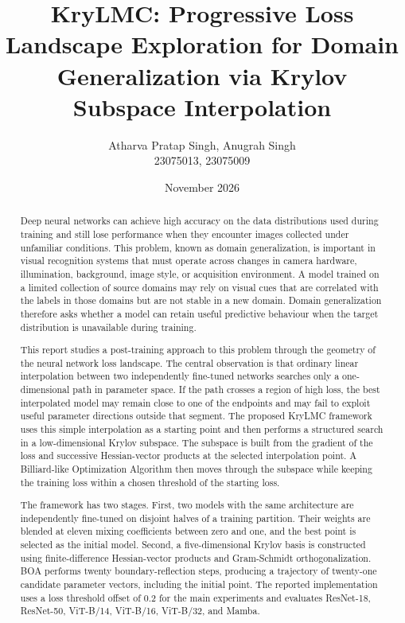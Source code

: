 \documentclass[11pt,a4paper]{article}
\title{\textbf{KryLMC: Progressive Loss Landscape Exploration for Domain Generalization via Krylov Subspace Interpolation}}
\author{Atharva Pratap Singh, Anugrah Singh\\23075013, 23075009}
\date{November 2026}
\begin{document}
\maketitle
\begingroup
\small
\tableofcontents
\endgroup
\newpage

\renewcommand{\abstractname}{1 Abstract}
\begin{abstract}
Deep neural networks can achieve high accuracy on the data distributions used during training and still lose performance when they encounter images collected under unfamiliar conditions. This problem, known as domain generalization, is important in visual recognition systems that must operate across changes in camera hardware, illumination, background, image style, or acquisition environment. A model trained on a limited collection of source domains may rely on visual cues that are correlated with the labels in those domains but are not stable in a new domain. Domain generalization therefore asks whether a model can retain useful predictive behaviour when the target distribution is unavailable during training.

This report studies a post-training approach to this problem through the geometry of the neural network loss landscape. The central observation is that ordinary linear interpolation between two independently fine-tuned networks searches only a one-dimensional path in parameter space. If the path crosses a region of high loss, the best interpolated model may remain close to one of the endpoints and may fail to exploit useful parameter directions outside that segment. The proposed KryLMC framework uses this simple interpolation as a starting point and then performs a structured search in a low-dimensional Krylov subspace. The subspace is built from the gradient of the loss and successive Hessian-vector products at the selected interpolation point. A Billiard-like Optimization Algorithm then moves through the subspace while keeping the training loss within a chosen threshold of the starting loss.

The framework has two stages. First, two models with the same architecture are independently fine-tuned on disjoint halves of a training partition. Their weights are blended at eleven mixing coefficients between zero and one, and the best point is selected as the initial model. Second, a five-dimensional Krylov basis is constructed using finite-difference Hessian-vector products and Gram-Schmidt orthogonalization. BOA performs twenty boundary-reflection steps, producing a trajectory of twenty-one candidate parameter vectors, including the initial point. The reported implementation uses a loss threshold offset of 0.2 for the main experiments and evaluates ResNet-18, ResNet-50, ViT-B/14, ViT-B/16, ViT-B/32, and Mamba.


\end{abstract}
\end{document}
